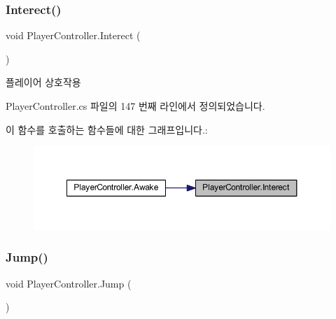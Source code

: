 \mbox{\label{class_player_controller_a2af84a2de0a9c5b304d91cc674e76fc1}} 
\subsubsection{\texorpdfstring{Interect()}{Interect()}}
{\footnotesize\ttfamily void Player\+Controller.\+Interect (\begin{DoxyParamCaption}{ }\end{DoxyParamCaption})}



플레이어 상호작용 



Player\+Controller.\+cs 파일의 147 번째 라인에서 정의되었습니다.


\begin{DoxyCode}{0}

\end{DoxyCode}
이 함수를 호출하는 함수들에 대한 그래프입니다.\+:
\nopagebreak
\begin{figure}[H]
\begin{center}
\leavevmode
\includegraphics[width=350pt]{dc/dde/class_player_controller_a2af84a2de0a9c5b304d91cc674e76fc1_icgraph}
\end{center}
\end{figure}
\mbox{\label{class_player_controller_a8a7010cb6f3c524737be3f6f77553df9}} 
\subsubsection{\texorpdfstring{Jump()}{Jump()}}
{\footnotesize\ttfamily void Player\+Controller.\+Jump (\begin{DoxyParamCaption}{ }\end{DoxyParamCaption})}



